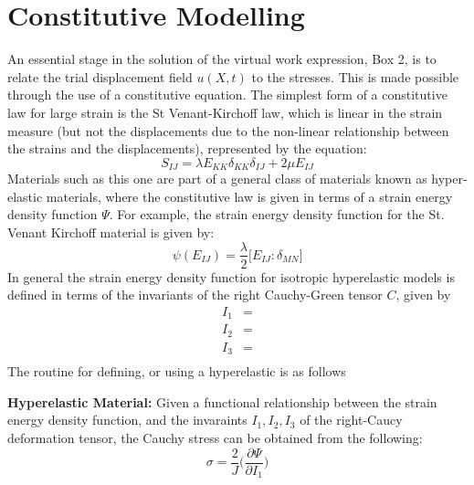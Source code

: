 \section{Constitutive Modelling}
An essential stage in the solution of the virtual work expression, Box 2, is to relate the trial displacement field $u(X,t)$ to the stresses. This is made possible through the use of a constitutive equation. The simplest form of a constitutive law for large strain is the St Venant-Kirchoff law, which is linear in the strain measure (but not the displacements due to the non-linear relationship between the strains and the displacements), represented by the equation:
\begin{equation}
S_{IJ} = \lambda E_{KK}\delta_{KK} \delta_{IJ} + 2\mu E_{IJ}
\end{equation}
Materials such as this one are part of a general class of materials known as hyper-elastic materials, where the constitutive law is given in terms of a strain energy density function $\Psi$. For example, the strain energy density function for the St. Venant Kirchoff material is given by:
\begin{equation}
\psi(E_{IJ}) = \frac{\lambda}{2}\big[E_{IJ} : \delta_{MN} \big]
\end{equation}
In general the strain energy density function for isotropic hyperelastic models is defined in terms of the invariants of the right Cauchy-Green tensor $C$, given by
\begin{align*}
I_1 &= \\
I_2 &= \\
I_3 &= \\
\end{align*}
The routine for defining, or using a hyperelastic is as follows
\begin{tcolorbox}
\textbf{Hyperelastic Material:}
Given a functional relationship between the strain energy density function, and the invaraints $I_1,I_2,I_3$ of the right-Caucy deformation tensor, the Cauchy stress can be obtained from the following:
\begin{equation}
\sigma = \frac{2}{J}\bigg(\frac{\partial \Psi}{\partial I_1}\bigg)
\end{equation}

\end{tcolorbox}




